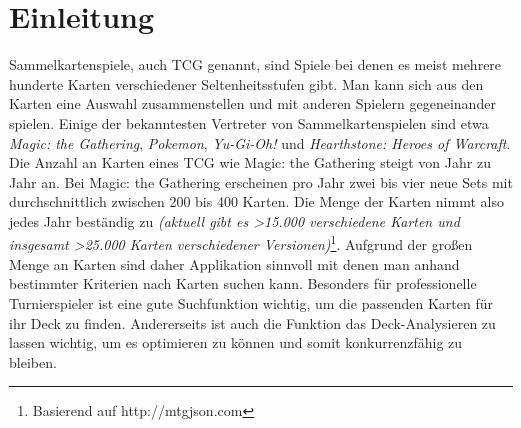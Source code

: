 \chapter{Einleitung}\label{ch:intro}
%
%

Sammelkartenspiele, auch \ac{TCG} genannt, sind Spiele bei denen es meist mehrere hunderte Karten verschiedener Seltenheitsstufen gibt. Man kann sich aus den Karten eine Auswahl zusammenstellen und mit anderen Spielern gegeneinander spielen. Einige der bekanntesten Vertreter von Sammelkartenspielen sind etwa \emph{Magic: the Gathering}, \emph{Pokemon}, \emph{Yu-Gi-Oh!} und \emph{Hearthstone: Heroes of Warcraft}. Die Anzahl an Karten eines \ac{TCG} wie Magic: the Gathering steigt von Jahr zu Jahr an. Bei Magic: the Gathering erscheinen pro Jahr zwei bis vier neue Sets mit durchschnittlich zwischen 200 bis 400 Karten. Die Menge der Karten nimmt also jedes Jahr beständig zu \emph{(aktuell gibt es >15.000 verschiedene Karten und insgesamt >25.000 Karten verschiedener Versionen)}\footnote{Basierend auf http://mtgjson.com}. Aufgrund der großen Menge an Karten sind daher Applikation sinnvoll mit denen man anhand bestimmter Kriterien nach Karten suchen kann. Besonders für professionelle Turnierspieler ist eine gute Suchfunktion wichtig, um die passenden Karten für ihr Deck zu finden. Andererseits ist auch die Funktion das Deck-Analysieren zu lassen wichtig, um es optimieren zu können und somit konkurrenzfähig zu bleiben.

